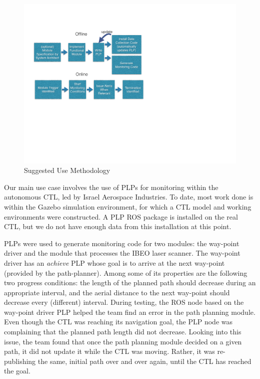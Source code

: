 \documentclass[letterpaper]{article}
\begin{document}
{\begin{figure}[t]
\centering
\vspace{-2cm}
\includegraphics[scale=0.4]{methodology}
\vspace{-5cm}
\caption{Suggested Use Methodology}
\label{fig:methodology}
\vspace{-0.0cm}
\end{figure}

Our main use case involves the use of PLPs for monitoring within the autonomous CTL, led by Israel Aerospace Industries. To date, most work done is within the Gazebo simulation environment, for which a CTL model and working environments were constructed. A PLP ROS package is installed on the real  CTL, but we do not have enough data from this installation at this point.

PLPs were used to generate monitoring
code for two modules: the way-point driver and the module that processes the IBEO laser scanner. The way-point driver has an 
{\em achieve} PLP whose goal is to arrive at the next way-point (provided by the path-planner). Among some of its properties are the following two
progress conditions: the length of the planned path should decrease during an appropriate interval, and 
the aerial distance to the next way-point should decrease every
(different) interval.
During testing, the ROS node based on the way-point driver PLP helped the team find an error in the path planning module. Even though the CTL was reaching its navigation goal, the PLP node was complaining that the planned path length did not decrease. Looking into this issue, the team found that once the path planning module decided on a given path, it did not update it while the CTL was moving. Rather, it was re-publishing the same, initial path over and over again, until the CTL has reached the goal.

}
\end{document}
